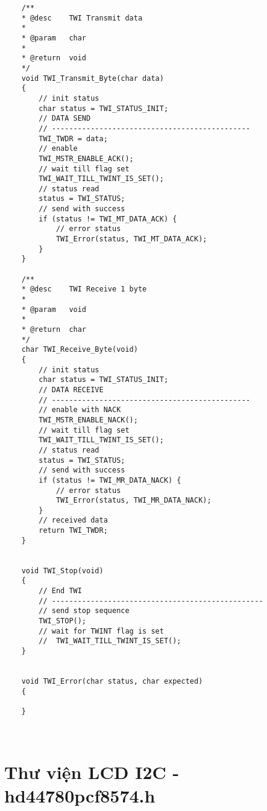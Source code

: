 \begin{lstlisting}
	/**
	* @desc    TWI Transmit data
	*
	* @param   char
	*
	* @return  void
	*/
	void TWI_Transmit_Byte(char data)
	{
		// init status
		char status = TWI_STATUS_INIT;
		// DATA SEND
		// ----------------------------------------------
		TWI_TWDR = data;
		// enable
		TWI_MSTR_ENABLE_ACK();
		// wait till flag set
		TWI_WAIT_TILL_TWINT_IS_SET();
		// status read
		status = TWI_STATUS;
		// send with success
		if (status != TWI_MT_DATA_ACK) {
			// error status
			TWI_Error(status, TWI_MT_DATA_ACK);
		}
	}
	
	/**
	* @desc    TWI Receive 1 byte
	*
	* @param   void
	*
	* @return  char
	*/
	char TWI_Receive_Byte(void)
	{
		// init status
		char status = TWI_STATUS_INIT;
		// DATA RECEIVE
		// ----------------------------------------------
		// enable with NACK
		TWI_MSTR_ENABLE_NACK();
		// wait till flag set
		TWI_WAIT_TILL_TWINT_IS_SET();
		// status read
		status = TWI_STATUS;
		// send with success
		if (status != TWI_MR_DATA_NACK) {
			// error status
			TWI_Error(status, TWI_MR_DATA_NACK);
		}
		// received data
		return TWI_TWDR;
	}
	
	
	void TWI_Stop(void)
	{
		// End TWI
		// -------------------------------------------------
		// send stop sequence
		TWI_STOP();
		// wait for TWINT flag is set
		//  TWI_WAIT_TILL_TWINT_IS_SET();
	}
	
	
	void TWI_Error(char status, char expected)
	{ 
		
	}



\end{lstlisting}


\section{Thư viện LCD I2C - hd44780pcf8574.h }

